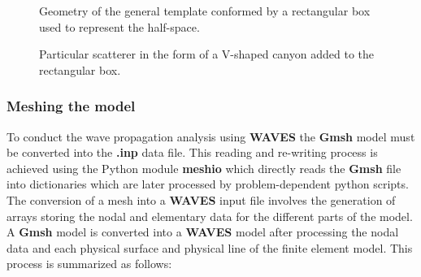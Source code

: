 \documentclass[12pt,letterpaper]{article}
\begin{document}
\begin{figure}[H]
\centering
{}
\caption{Geometry of the general template conformed by a rectangular box used to represent the half-space.}
\label{fig:plantilla}
\end{figure}


\begin{figure}[H]
\centering
{}
\caption{Particular scatterer in the form of a V-shaped canyon added to the rectangular box.}
\label{fig:modelo canon}
\end{figure}

\subsubsection*{Meshing the model}
To conduct the wave propagation analysis using {\bf WAVES} the {\bf Gmsh} model must be converted into the {\bf .inp} data file. This reading and re-writing process is achieved using the Python module {\bf meshio} which directly reads the {\bf Gmsh} file into dictionaries which are later processed by problem-dependent python scripts. The conversion of a mesh into a {\bf WAVES} input file involves the generation of arrays storing the nodal and elementary data for the different parts of the model. A {\bf Gmsh} model is converted into a {\bf WAVES} model after processing the nodal data and each physical surface and physical line of the finite element model. This process is summarized as follows:
\end{document}
